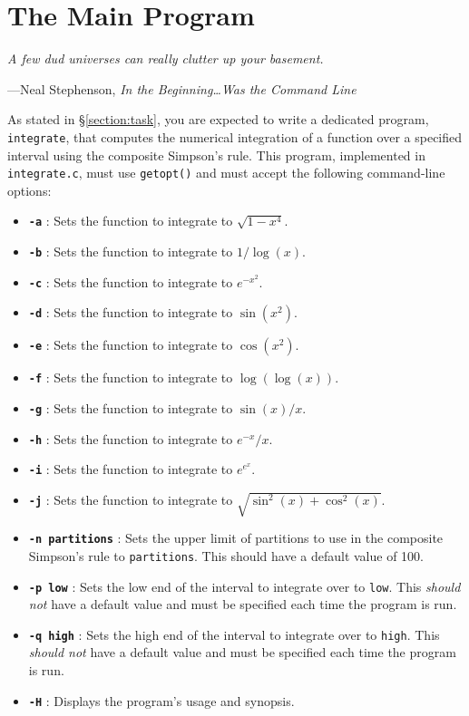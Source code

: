 \section{The Main Program}

\textwidth
\epigraph{\emph{A few dud universes can really clutter up your
basement.}} {---Neal Stephenson, \emph{In the Beginning\ldots Was the
Command Line}}

\noindent As stated in \S\ref{section:task}, you are expected to write a
dedicated program, \texttt{integrate}, that computes the numerical
integration of a function over a specified interval using the composite
Simpson's rule. This program, implemented in \texttt{integrate.c}, must
use \texttt{getopt()} and must accept the following command-line
options:

\begin{itemize}
  \item \textbf{\texttt{-a}} : Sets the function to integrate to
    $\sqrt{1 - x^4}$.
  \item \textbf{\texttt{-b}} : Sets the function to integrate to
    ${1}/{\log(x)}$.
  \item \textbf{\texttt{-c}} : Sets the function to integrate to
    $e^{-x^2}$.
  \item \textbf{\texttt{-d}} : Sets the function to integrate to
    $\sin(x^2)$.
  \item \textbf{\texttt{-e}} : Sets the function to integrate to
    $\cos(x^2)$.
  \item \textbf{\texttt{-f}} : Sets the function to integrate to
    $\log(\log(x))$.
  \item \textbf{\texttt{-g}} : Sets the function to integrate to
    ${\sin(x)}/{x}$.
  \item \textbf{\texttt{-h}} : Sets the function to integrate to
    ${e^{-x}}/{x}$.
  \item \textbf{\texttt{-i}} : Sets the function to integrate to
    $e^{e^x}$.
\item \textbf{\texttt{-j}} : Sets the function to integrate to $\sqrt{\sin^2(x) + \cos^2(x)}$.
  \item \textbf{\texttt{-n partitions}} : Sets the upper limit of
    partitions to use in the composite Simpson's rule to
    \texttt{partitions}. This should have a default value of 100.
  \item \textbf{\texttt{-p low}} : Sets the low end of the interval to
    integrate over to \texttt{low}. This \emph{should not} have a
    default value and must be specified each time the program is run.
  \item \textbf{\texttt{-q high}} : Sets the high end of the interval to
    integrate over to \texttt{high}. This \emph{should not} have a
    default value and must be specified each time the program is run.
  \item \textbf{\texttt{-H}} : Displays the program's usage and
    synopsis.
\end{itemize}

